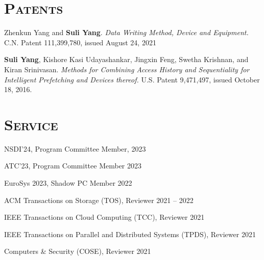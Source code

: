 \documentclass[10pt, letterpaper]{article}
\renewenvironment{itemize}{
  \begin{list}{}{
    \setlength{\leftmargin}{1.2em}
    \setlength{\itemsep}{0.12em}
    \setlength{\parskip}{0pt}
    \setlength{\parsep}{0.12em}
  }
}{
  \end{list}
}
\begin{document}
\section*{\textsc{Patents}}
\begin{enumerate}[fullwidth,itemindent=1.1em,label={[\arabic*]}]
    \item Zhenkun Yang and {\bf Suli Yang}. \textit{Data Writing Method, Device and Equipment.} C.N. Patent 111,399,780, issued August 24, 2021

     \item {\bf Suli Yang}, Kishore Kasi Udayashankar, Jingxin Feng, Swetha Krishnan, and Kiran Srinivasan. \textit{Methods for Combining Access History and Sequentiality for Intelligent Prefetching and Devices thereof.} U.S. Patent 9,471,497, issued October 18, 2016.

\end{enumerate}


\section*{\textsc{Service}}
\begin{itemize}
	\item NSDI'24, Program Committee Member, \hfill 2023
        \item ATC'23, Program Committee Member \hfill 2023
	\item EuroSys 2023, Shadow PC Member \hfill 2022
	\item ACM Transactions on Storage (TOS), Reviewer \hfill 2021 -- 2022
	\item IEEE Transactions on Cloud Computing (TCC), Reviewer \hfill 2021
        \item IEEE Transactions on Parallel and Distributed Systems (TPDS), Reviewer \hfill 2021
	\item Computers \& Security (COSE), Reviewer \hfill 2021
\end{itemize}
\end{document}
